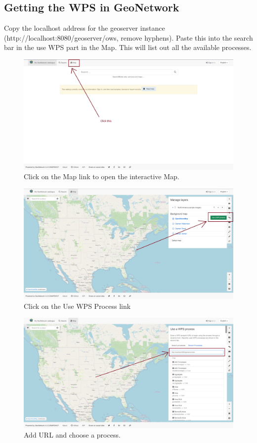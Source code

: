 \documentclass{article}
\begin{document}
        \subsection*{Getting the WPS in GeoNetwork}
        \hspace{1.5em}Copy the localhost address for the geoserver instance (http://localhost:8080/\-geoserver/ows, remove hyphens). Paste this into the search bar in the use WPS part in the Map. This will list out all the available processes.
        \begin{figure}[h!]
            \centering
            \includegraphics[width=\textwidth]{../images/Map.jpg}
            \caption{Click on the Map link to open the interactive Map.}
            \label{fig:fig-1}
        \end{figure}
        \begin{figure}[h!]
            \centering
            \includegraphics[width=\textwidth]{../images/Use WPS Process.jpg}
            \caption{Click on the Use WPS Process link}
            \label{fig:fig-2}
        \end{figure}
        \begin{figure}[h!]
            \centering
            \includegraphics[width=\textwidth]{../images/Adding URL.jpg}
            \caption{Add URL and choose a process.}
            \label{fig:fig-3}
        \end{figure}
\end{document}
